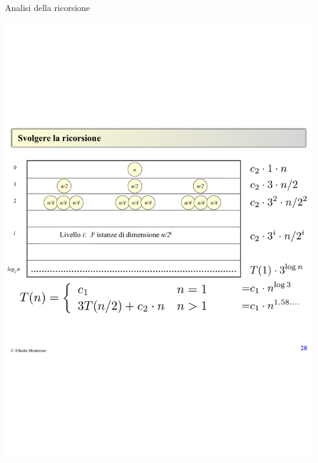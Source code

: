 \begin{frame}{Analisi della ricorsione}

\includegraphics[width=\textwidth]{karatsuba.pdf}

\end{frame}


